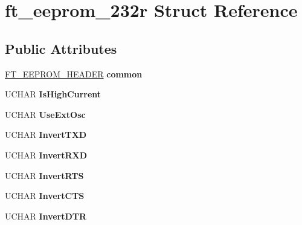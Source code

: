 \hypertarget{structft__eeprom__232r}{}\section{ft\+\_\+eeprom\+\_\+232r Struct Reference}
\label{structft__eeprom__232r}
\subsection*{Public Attributes}
\begin{DoxyCompactItemize}
\item 
\mbox{\label{structft__eeprom__232r_a04ed9a15b88229df4567d6c9ccd6c99d}} 
\hyperlink{structft__eeprom__header}{F\+T\+\_\+\+E\+E\+P\+R\+O\+M\+\_\+\+H\+E\+A\+D\+ER} {\bfseries common}
\item 
\mbox{\label{structft__eeprom__232r_abd8a4afecd3fa431c7654d14886395dd}} 
U\+C\+H\+AR {\bfseries Is\+High\+Current}
\item 
\mbox{\label{structft__eeprom__232r_af430c36e3ca675a6860463b70b963369}} 
U\+C\+H\+AR {\bfseries Use\+Ext\+Osc}
\item 
\mbox{\label{structft__eeprom__232r_ae284d5a2e53c8e77dcbdd7789734b8f0}} 
U\+C\+H\+AR {\bfseries Invert\+T\+XD}
\item 
\mbox{\label{structft__eeprom__232r_afbb26654eac5fa6266726e42f26ed317}} 
U\+C\+H\+AR {\bfseries Invert\+R\+XD}
\item 
\mbox{\label{structft__eeprom__232r_accb739bb2d2c81f31cb9e7e634d15e7c}} 
U\+C\+H\+AR {\bfseries Invert\+R\+TS}
\item 
\mbox{\label{structft__eeprom__232r_a95c9b6e2547151c62c36a981e3d121e6}} 
U\+C\+H\+AR {\bfseries Invert\+C\+TS}
\item 
\mbox{\label{structft__eeprom__232r_a782d2b0ecc30bae4b3f967fc349f6808}} 
U\+C\+H\+AR {\bfseries Invert\+D\+TR}
\item 
\mbox{\label{structft__eeprom__232r_af9f2706ecbe6182d52bce8d237cc9162}} 

\end{DoxyCompactItemize}
